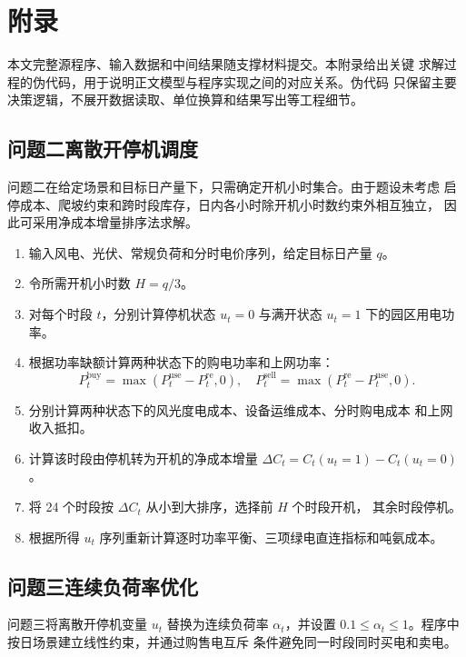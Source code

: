 \section{附录}

本文完整源程序、输入数据和中间结果随支撑材料提交。本附录给出关键
求解过程的伪代码，用于说明正文模型与程序实现之间的对应关系。伪代码
只保留主要决策逻辑，不展开数据读取、单位换算和结果写出等工程细节。

\subsection{问题二离散开停机调度}

问题二在给定场景和目标日产量下，只需确定开机小时集合。由于题设未考虑
启停成本、爬坡约束和跨时段库存，日内各小时除开机小时数约束外相互独立，
因此可采用净成本增量排序法求解。

\begin{enumerate}[label=\textbf{步骤~\arabic*.},leftmargin=4em]
  \item 输入风电、光伏、常规负荷和分时电价序列，给定目标日产量 $q$。
  \item 令所需开机小时数 $H=q/3$。
  \item 对每个时段 $t$，分别计算停机状态 $u_t=0$ 与满开状态 $u_t=1$
        下的园区用电功率。
  \item 根据功率缺额计算两种状态下的购电功率和上网功率：
        \[
          P_t^{\mathrm{buy}}=\max(P_t^{\mathrm{use}}-P_t^{\mathrm{re}},0),
          \quad
          P_t^{\mathrm{sell}}=\max(P_t^{\mathrm{re}}-P_t^{\mathrm{use}},0).
        \]
  \item 分别计算两种状态下的风光度电成本、设备运维成本、分时购电成本
        和上网收入抵扣。
  \item 计算该时段由停机转为开机的净成本增量
        $\Delta C_t=C_t(u_t=1)-C_t(u_t=0)$。
  \item 将 24 个时段按 $\Delta C_t$ 从小到大排序，选择前 $H$ 个时段开机，
        其余时段停机。
  \item 根据所得 $u_t$ 序列重新计算逐时功率平衡、三项绿电直连指标和吨氨成本。
\end{enumerate}

\subsection{问题三连续负荷率优化}

问题三将离散开停机变量 $u_t$ 替换为连续负荷率 $\alpha_t$，并设置
$0.1\leq\alpha_t\leq1$。程序中按日场景建立线性约束，并通过购售电互斥
条件避免同一时段同时买电和卖电。

